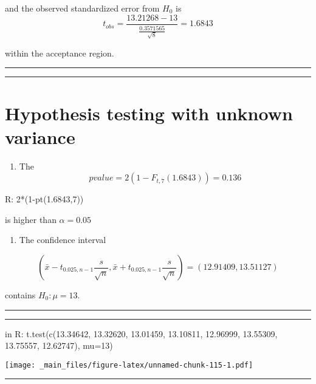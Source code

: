 \documentclass[
]{book}
\providecommand{\tightlist}{%
  \setlength{\itemsep}{0pt}\setlength{\parskip}{0pt}}
\begin{document}
and the observed standardized error from \(H_0\) is
\[t_{obs} =  \frac{13.21268-13}{\frac{0.3571565}{\sqrt{8}}}=1.6843\]

within the acceptance region.

\begin{center}\rule{0.5\linewidth}{0.5pt}\end{center}

\begin{center}\rule{0.5\linewidth}{0.5pt}\end{center}

\hypertarget{hypothesis-testing-with-unknown-variance-1}{%
\section{Hypothesis testing with unknown variance}\label{hypothesis-testing-with-unknown-variance-1}}

\begin{enumerate}
\def\labelenumi{\arabic{enumi}.}
\setcounter{enumi}{1}
\tightlist
\item
  The \[pvalue=2(1-F_{t,7}(1.6843))=0.136\]
\end{enumerate}

R: 2*(1-pt(1.6843,7))

is higher than \(\alpha=0.05\)

\begin{enumerate}
\def\labelenumi{\arabic{enumi}.}
\setcounter{enumi}{2}
\tightlist
\item
  The confidence interval
\end{enumerate}

\[(\bar{x}-t_{0.025, n-1} \frac{s}{\sqrt{n}}, \bar{x}+t_{0.025, n-1} \frac{s}{\sqrt{n}})=(12.91409, 13.51127)\]

contains \(H_0:\mu=13\).

\begin{center}\rule{0.5\linewidth}{0.5pt}\end{center}

\begin{center}\rule{0.5\linewidth}{0.5pt}\end{center}

in R:
t.test(c(13.34642, 13.32620, 13.01459, 13.10811,
12.96999, 13.55309, 13.75557, 12.62747), mu=13)

\texttt{[image: \_main\_files/figure-latex/unnamed-chunk-115-1.pdf]}

\begin{center}\rule{0.5\linewidth}{0.5pt}\end{center}
\end{document}
